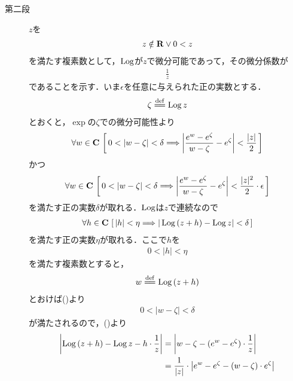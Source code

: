 \begin{sketch}
\begin{description}
			\item[第二段]
				$z$を
				\begin{align}
					z \notin \mathbf{R} \vee 0 < z
				\end{align}
				を満たす複素数として，$\operatorname{Log}$が$z$で微分可能であって，その微分係数が
				\begin{align}
					\frac{1}{z}
				\end{align}
				であることを示す．いま$\epsilon$を任意に与えられた正の実数とする．
				\begin{align}
					\zeta \defeq \pvlog{z}
				\end{align}
				とおくと，$\exp$の$\zeta$での微分可能性より
				\begin{align}
					\forall w \in \mathbf{C}\, 
					\left[\, 0 < |w - \zeta| < \delta
					\Longrightarrow \left|\frac{e^{w} - e^{\zeta}}{w-\zeta} - e^{\zeta}\right| < \frac{|z|}{2}\, \right]
					\label{fom:thm_pv_log_is_holomorphic_2}
				\end{align}
				かつ
				\begin{align}
					\forall w \in \mathbf{C}\, 
					\left[\, 0 < |w - \zeta| < \delta
					\Longrightarrow \left|\frac{e^{w} - e^{\zeta}}{w-\zeta} - e^{\zeta}\right| < \frac{|z|^2}{2} \cdot \epsilon\, \right]
					\label{fom:thm_pv_log_is_holomorphic_3}
				\end{align}
				を満たす正の実数$\delta$が取れる．$\operatorname{Log}$は$z$で連続なので
				\begin{align}
					\forall h \in \mathbf{C}\,
					\left[\, |h| < \eta \Longrightarrow 
					|\operatorname{Log}{(z+h)} - \operatorname{Log}{z}| < \delta\, \right]
					\label{fom:thm_pv_log_is_holomorphic_4}
				\end{align}
				を満たす正の実数$\eta$が取れる．ここで$h$を
				\begin{align}
					0 < |h| < \eta
				\end{align}
				を満たす複素数とすると，
				\begin{align}
					w \defeq \pvlog{(z+h)}
				\end{align}
				とおけば()より
				\begin{align}
					0 < |w - \zeta| < \delta
				\end{align}
				が満たされるので，()より
				\begin{align}
					\left|\pvlog{(z+h)} - \pvlog{z} - h \cdot \frac{1}{z}\right|
					&= \left|w - \zeta - (e^{w} - e^{\zeta}) \cdot \frac{1}{z}\right| \\
					&= \frac{1}{|z|} \cdot \left|e^{w} - e^{\zeta} - (w - \zeta) \cdot e^{\zeta}\right| \\

\end{align}
\end{description}
\end{sketch}
